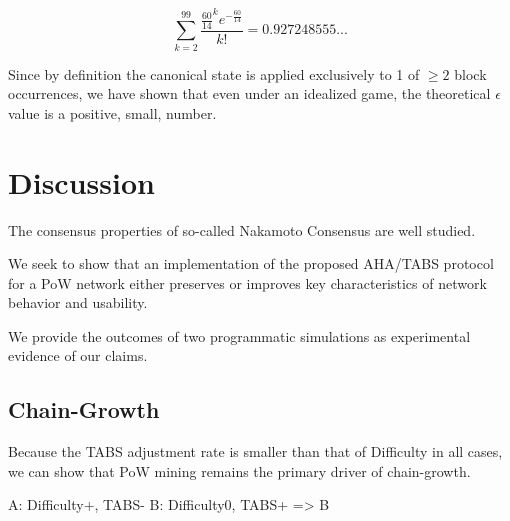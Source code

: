 \documentclass[11pt]{article}
\theoremstyle{plain}
\begin{document}
{{%
\begin{equation}
    \sum_{k=2}^{99}\frac{\frac{60}{14}^{k}e^{-\frac{60}{14}}}{k!} = 0.927248555...
\end{equation}


Since by definition the canonical state is applied exclusively to 1 of
$\geq 2$ block occurrences, we have shown that even under an idealized game,
the theoretical $\epsilon$ value is a positive, small, number.
} %


\section{\normalsize{Discussion}}

The consensus properties of so-called Nakamoto Consensus are well studied.

We seek to show that an implementation of the proposed AHA/TABS protocol for a PoW network
either preserves or improves key characteristics of network behavior and usability.

We provide the outcomes of two programmatic simulations as experimental evidence of our claims.

\subsection{\normalsize{Chain-Growth}}

Because the TABS adjustment rate is smaller than that of Difficulty in all cases,
we can show that PoW mining remains the primary driver of chain-growth.

%
%

A: Difficulty+, TABS-
B: Difficulty0, TABS+
=> B

}
\end{document}

